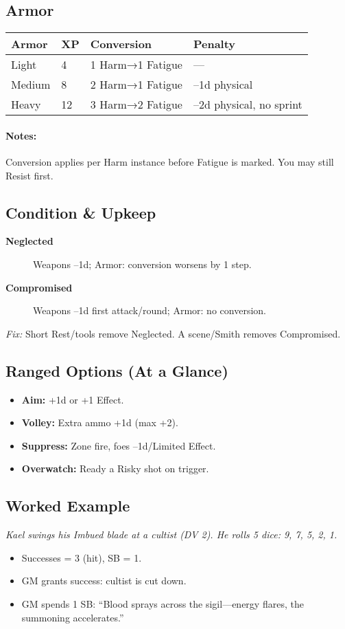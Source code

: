 \subsection{Armor}
\begin{tabular}{llll}
\toprule
\textbf{Armor} & \textbf{XP} & \textbf{Conversion} & \textbf{Penalty} \\
\midrule
Light  & 4  & 1 Harm→1 Fatigue & — \\
Medium & 8  & 2 Harm→1 Fatigue & –1d physical \\
Heavy  & 12 & 3 Harm→2 Fatigue & –2d physical, no sprint \\
\bottomrule
\end{tabular}

\paragraph{Notes:} Conversion applies per Harm instance before Fatigue is marked. You may still Resist first.

\subsection{Condition \& Upkeep}
\begin{description}
  \item[\textbf{Neglected}] Weapons –1d; Armor: conversion worsens by 1 step.
  \item[\textbf{Compromised}] Weapons –1d first attack/round; Armor: no conversion.
\end{description}
\emph{Fix:} Short Rest/tools remove Neglected. A scene/Smith removes Compromised.

\subsection{Ranged Options (At a Glance)}
\begin{itemize}
  \item \textbf{Aim:} +1d or +1 Effect.  
  \item \textbf{Volley:} Extra ammo +1d (max +2).  
  \item \textbf{Suppress:} Zone fire, foes –1d/Limited Effect.  
  \item \textbf{Overwatch:} Ready a Risky shot on trigger.  
\end{itemize}

\subsection{Worked Example}
\emph{Kael swings his Imbued blade at a cultist (DV 2). He rolls 5 dice: 9, 7, 5, 2, 1.}
\begin{itemize}
  \item Successes = 3 (hit), SB = 1.
  \item GM grants success: cultist is cut down.
  \item GM spends 1 SB: ``Blood sprays across the sigil—energy flares, the summoning accelerates.''
\end{itemize}

